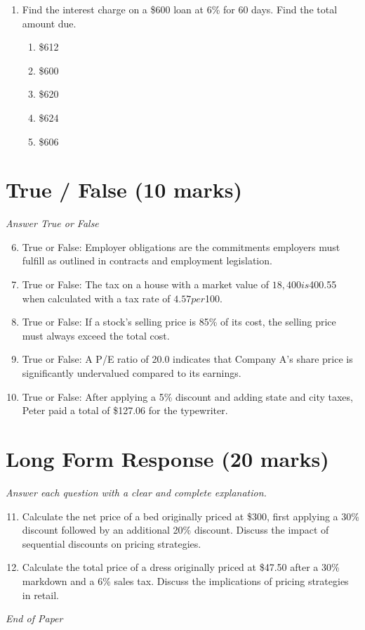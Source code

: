 \documentclass[12pt]{article}
\begin{document}
\begin{enumerate}[label=\arabic*.]
\begin{enumerate}[label=(\alph*)]
    \item 10\%
    \item 30\%
\end{enumerate}
\item Find the interest charge on a \$600 loan at 6\% for 60 days. Find the total amount due.
\begin{enumerate}[label=(\alph*)]
    \item \$612
    \item \$600
    \item \$620
    \item \$624
    \item \$606
\end{enumerate}
\end{enumerate}

\section*{True / False (10 marks)}
\textit{Answer True or False}
\begin{enumerate}[label=\arabic*.]
\setcounter{enumi}{5}
\item True or False: Employer obligations are the commitments employers must fulfill as outlined in contracts and employment legislation.
\item True or False: The tax on a house with a market value of $18,400 is $400.55 when calculated with a tax rate of $4.57 per $100.
\item True or False: If a stock's selling price is 85\% of its cost, the selling price must always exceed the total cost.
\item True or False: A P/E ratio of 20.0 indicates that Company A's share price is significantly undervalued compared to its earnings.
\item True or False: After applying a 5\% discount and adding state and city taxes, Peter paid a total of \$127.06 for the typewriter.
\end{enumerate}

\section*{Long Form Response (20 marks)}
\textit{Answer each question with a clear and complete explanation.}
\begin{enumerate}[label=\arabic*.]
\setcounter{enumi}{10}
\item Calculate the net price of a bed originally priced at \$300, first applying a 30\% discount
followed by an additional 20\% discount. Discuss the impact of sequential discounts on
pricing strategies.
\item Calculate the total price of a dress originally priced at \$47.50 after a 30\% markdown and
a 6\% sales tax. Discuss the implications of pricing strategies in retail.
\end{enumerate}

\vfill
\noindent\textit{End of Paper}
\end{document}
